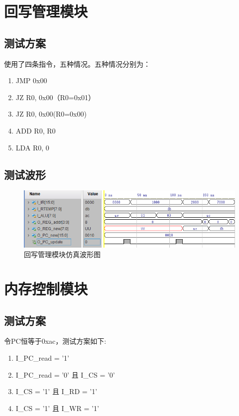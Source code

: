 \documentclass[forprint]{WHUBachelor}
\begin{document}
\section{回写管理模块}

\subsection{测试方案}

使用了四条指令，五种情况。五种情况分别为：
\begin{enumerate}[1.]
\item JMP 0x00
\item JZ R0, 0x00（R0=0x01）
\item JZ R0, 0x00(R0=0x00)
\item ADD R0, R0
\item LDA R0, 0
\end{enumerate}

\subsection{测试波形}

\begin{figure}[H]
  \centering
  \includegraphics[width=5in]{figures/waveforms/write_back.png}
  \caption{回写管理模块仿真波形图}
  \label{fig:wave:write_back}
\end{figure}

\section{内存控制模块}

\subsection{测试方案}

令PC恒等于0xac，测试方案如下:
\begin{enumerate}[1.]
\item I\_PC\_read = '1'
\item I\_PC\_read = '0' 且 I\_CS = '0'
\item I\_CS = '1' 且 I\_RD = '1'
\item I\_CS = '1' 且 I\_WR = '1'
\end{enumerate}
\end{document}
